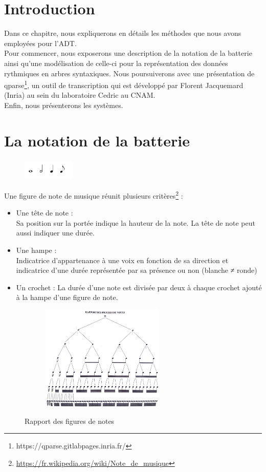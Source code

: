 \section*{Introduction}
Dans ce chapitre, nous expliquerons en détails les méthodes que nous avons employées pour l’ADT.\\
Pour commencer, nous exposerons une description de la notation de la batterie ainsi qu’une modélisation de celle-ci pour la représentation des données rythmiques en arbres syntaxiques. Nous poursuiverons avec une présentation de qparse\footnote{https://qparse.gitlabpages.inria.fr/}, un outil de transcription qui est développé par Florent Jacquemard (Inria) au sein du laboratoire Cedric au CNAM.\\
Enfin, nous présenterons les systèmes. 
\section{La notation de la batterie}
\begin{figure}[h]
	\centering
	\includegraphics[height=10mm, width=25mm]{z_images/3_methodes/figures_de_notes.png}
\end{figure}
Une figure de note \cite{danhauser} de musique réunit plusieurs critères\footnote{\url{https://fr.wikipedia.org/wiki/Note_de_musique}} :
\begin{itemize}
	\item Une tête de note :\\
	Sa position sur la portée indique la hauteur de la note. La tête de note peut aussi indiquer une durée.
	\item Une hampe :\\
	Indicatrice d’appartenance à une voix en fonction de sa direction et indicatrice d’une durée représentée par sa présence ou non (blanche ≠ ronde)
	\item Un crochet : La durée d’une note est divisée par deux à chaque crochet ajouté à la hampe d’une figure de note.
\end{itemize}
\begin{figure}[h]
	\centering
	\includegraphics[height=50mm, width=80mm]{z_images/3_methodes/rapport_figures_notes.png}
	\caption{Rapport des figures de notes}\cite{danhauser}
	\label{rapp_fig_notes}
\end{figure}

